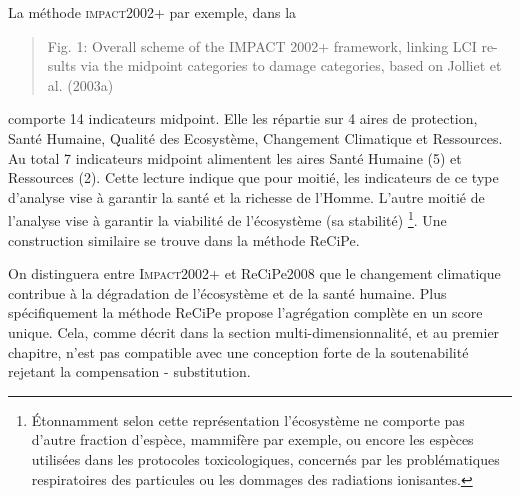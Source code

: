     La méthode \textsc{impact}2002+ par exemple, dans la 
    \blockcquote{jolliet_impact_2003}{
    Fig. 1: Overall scheme of the IMPACT 2002+ framework, linking LCI re-
    sults via the midpoint categories to damage categories, based on Jolliet et
    al. (2003a)
    }
    comporte 14 indicateurs midpoint.
    Elle les répartie sur 4 aires de protection, Santé Humaine, Qualité des Ecosystème, Changement Climatique et Ressources.
    Au total 7 indicateurs midpoint alimentent les aires Santé Humaine (5) et Ressources (2).
    Cette lecture indique que pour moitié, les indicateurs de ce type d’analyse vise à garantir la santé et la richesse de l’Homme.
    L’autre moitié de l’analyse vise à garantir la viabilité de l’écosystème (sa stabilité)
    \footnote{Étonnamment selon cette représentation l’écosystème ne comporte pas d’autre fraction d’espèce, mammifère par exemple, ou encore les espèces utilisées dans les protocoles toxicologiques, concernés par les problématiques respiratoires des particules ou les dommages des radiations ionisantes.}.
%  
    Une construction similaire se trouve dans la méthode ReCiPe.
  
On distinguera entre \textsc{Impact}2002+ et ReCiPe2008 que le changement climatique contribue à la dégradation de l'écosystème et de la santé humaine.
Plus spécifiquement la méthode ReCiPe propose l'agrégation complète en un score unique.
Cela, comme décrit dans la section multi-dimensionnalité, et au premier chapitre, n'est pas compatible avec une conception forte de la soutenabilité rejetant la compensation - substitution.
   
